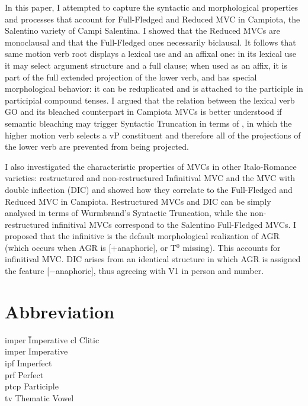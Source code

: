 \documentclass[output=paper]{langscibook}
\begin{document}
In this paper, I attempted to capture the syntactic and morphological properties and processes that account for Full-Fledged and Reduced MVC in Campiota, the Salentino variety of Campi Salentina. I showed that the Reduced MVCs are monoclausal and that the Full-Fledged ones necessarily biclausal. It follows that same motion verb root displays a lexical use and an affixal one:  in its lexical use it may select argument structure and a full clause; when used as an affix, it is part of the full extended projection of the lower verb, and has special morphological behavior: it can be reduplicated and is attached to the participle in participial compound tenses. I argued that the relation between the lexical verb GO and its bleached counterpart in Campiota MVCs is better understood if semantic bleaching may trigger Syntactic Truncation  in terms of \citet{wurmbrand2014a, wurmbrand2015, wurmbrand2017verb}, in which the higher motion verb selects a vP constituent and therefore all of the projections of the lower verb are prevented from being projected.

I also investigated the characteristic properties of MVCs in other Italo-Ro\-mance varieties: restructured and non-restructured Infinitival MVC and the MVC with double inflection (DIC) and showed how they correlate to the Full-Fledged and Reduced MVC in Campiota.  Restructured MVCs and DIC can be simply analysed in terms of Wurmbrand's Syntactic Truncation, while the non-restructured infinitival MVCs correspond to the Salentino Full-Fledged MVCs.  I proposed that the infinitive is the default morphological realization of AGR (which occurs when AGR is [+anaphoric], or T$^0$ missing).  This accounts for infinitival MVC.  DIC arises from an identical structure in which AGR is assigned the feature \mbox{[−anaphoric]}, thus agreeing with V1 in person and number.

\section*{Abbreviation}
\begin{multicols}{3}
\begin{tabbing}
{\sc imper}\hspace{.5ex} \= Imperative \kill
{\sc cl} \> Clitic \\
{\sc imper} \> Imperative \\
{\sc ipf} \> Imperfect\\
{\sc prf} \> Perfect\\
{\sc ptcp} \> Participle\\
{\sc tv} \> Thematic Vowel
\end{tabbing}
\end{multicols}
\end{document}
